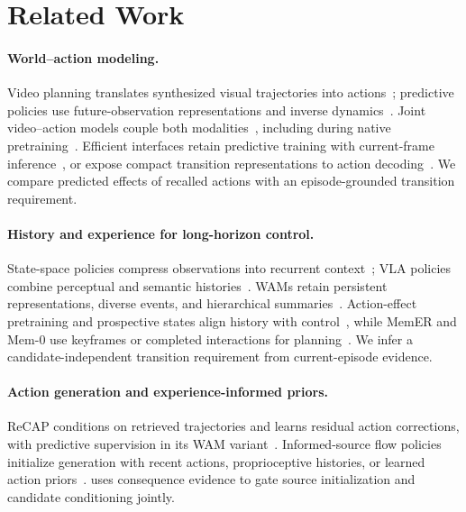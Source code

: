 \section{Related Work}
\label{sec:related}

\paragraph{World--action modeling.}
Video planning translates synthesized visual trajectories into actions~\citep{du2023unipi}; predictive policies use future-observation representations and inverse dynamics~\citep{tian2025seer,hu2025vpp}.
Joint video--action models couple both modalities~\citep{zhu2025uwm,bi2025motus,kim2026cosmospolicy,ye2026dreamzero}, including during native pretraining~\citep{zhang2026lingbotva2}.
Efficient interfaces retain predictive training with current-frame inference~\citep{yuan2026fastwam}, or expose compact transition representations to action decoding~\citep{ma2026pilot}.
We compare predicted effects of recalled actions with an episode-grounded transition requirement.

\paragraph{History and experience for long-horizon control.}
State-space policies compress observations into recurrent context~\citep{guan2026dssp}; VLA policies combine perceptual and semantic histories~\citep{shi2025memoryvla,torne2026mem}.
WAMs retain persistent representations, diverse events, and hierarchical summaries~\citep{yang2026memorywam,wang2026dimwam,sun2026himem}.
Action-effect pretraining and prospective states align history with control~\citep{zhou2026actioneffect,guo2026chameleon}, while MemER and Mem-0 use keyframes or completed interactions for planning~\citep{sridhar2025memer,chen2026rmbench}.
We infer a candidate-independent transition requirement from current-episode evidence.

\paragraph{Action generation and experience-informed priors.}
ReCAP conditions on retrieved trajectories and learns residual action corrections, with predictive supervision in its WAM variant~\citep{park2026recap}.
Informed-source flow policies initialize generation with recent actions, proprioceptive histories, or learned action priors~\citep{kang2026warmprior,jia2026a2a,machado2026lafm}.
\method{} uses consequence evidence to gate source initialization and candidate conditioning jointly.
